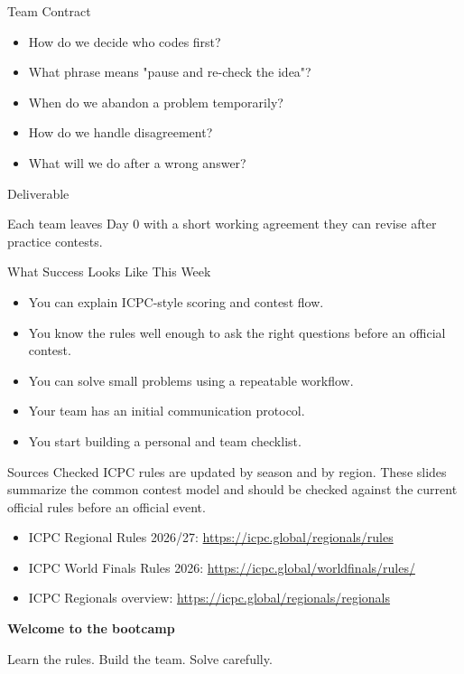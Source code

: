 \documentclass[aspectratio=169,11pt]{beamer}
\newenvironment{cpbox}[1]{%
  \begin{block}{#1}
  }{%
  \end{block}
}
\begin{document}
\begin{frame}{Team Contract}
  \begin{itemize}
    \item How do we decide who codes first?
    \item What phrase means "pause and re-check the idea"?
    \item When do we abandon a problem temporarily?
    \item How do we handle disagreement?
    \item What will we do after a wrong answer?
  \end{itemize}

  \vspace{0.35cm}
  \begin{cpbox}{Deliverable}
    Each team leaves Day 0 with a short working agreement they can revise after practice contests.
  \end{cpbox}
\end{frame}

\begin{frame}{What Success Looks Like This Week}
  \begin{itemize}
    \item You can explain ICPC-style scoring and contest flow.
    \item You know the rules well enough to ask the right questions before an official contest.
    \item You can solve small problems using a repeatable workflow.
    \item Your team has an initial communication protocol.
    \item You start building a personal and team checklist.
  \end{itemize}
\end{frame}

\begin{frame}{Sources Checked}
  \small
  ICPC rules are updated by season and by region. These slides summarize the common contest model and should be checked against the current official rules before an official event.

  \vspace{0.35cm}
  \begin{itemize}
    \item ICPC Regional Rules 2026/27: \url{https://icpc.global/regionals/rules}
    \item ICPC World Finals Rules 2026: \url{https://icpc.global/worldfinals/rules/}
    \item ICPC Regionals overview: \url{https://icpc.global/regionals/regionals}
  \end{itemize}
\end{frame}

\begin{frame}[plain]
  \begin{center}
    {\Huge\bfseries Welcome to the bootcamp}

    \vspace{0.5cm}
    {\Large Learn the rules. Build the team. Solve carefully.}
  \end{center}
\end{frame}
\end{document}
